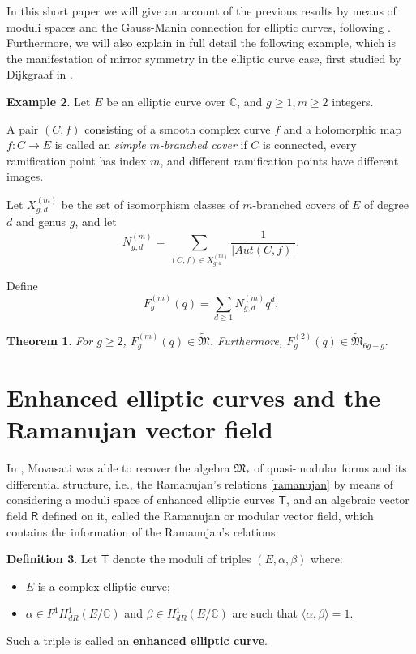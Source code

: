 \documentclass{article}
\numberwithin{equation}{section}
\numberwithin{figure}{section}
\theoremstyle{plain}
\newtheorem{theorem}{Theorem}[section]
\theoremstyle{definition}
\newtheorem{example}[theorem]{Example}
\newtheorem{definition}[theorem]{Definition}
\numberwithin{equation}{section}
\newtheorem[S, bodystyle=\normalfont\noindent]{defiS}{Definition}[section]
\begin{document}
In this short paper we will give an account of the previous results by means of moduli spaces and the Gauss-Manin connection for elliptic curves, following \parencite{mov2008,mov2012,pascal}. Furthermore, we will also explain in full detail the following example, which is the manifestation of mirror symmetry in the elliptic curve case, first studied by Dijkgraaf in \parencite{dijkgraaf}.
\begin{example}
Let $E$ be an elliptic curve over $\mathbb{C}$, and $g\geq 1, m\geq 2$ integers.

A pair $(C,f)$ consisting of a smooth complex curve $f$ and a holomorphic map $f:C\rightarrow E$ is called an \textit{simple $m$-branched cover} if $C$ is connected, every ramification point has index $m$, and different ramification points have different images.

Let $X_{g,d}^{(m)}$ be the set of isomorphism classes of $m$-branched covers of $E$ of degree $d$ and genus $g$, and let $$N_{g,d}^{(m)}=\sum_{(C,f)\in X_{g,d}^{(m)}} \frac{1}{|Aut{(C,f)}|}.$$

Define $$F_g^{(m)}(q)=\sum_{d\geq 1}N_{g,d}^{(m)}q^d.$$

\begin{theorem}\parencite{dijkgraaf,ochiai} For $g\geq 2$, $F_g^{(m)}(q)\in \mathfrak{\tilde{M}}$. Furthermore, $F_g^{(2)}(q)\in \mathfrak{\tilde{M}}_{6g-g}.$
\end{theorem}
\end{example}



\section{Enhanced elliptic curves and the Ramanujan vector field}


In \parencite{mov2008,mov2012,pascal}, Movasati was able to recover the algebra $\mathfrak{M}_{*}$ of quasi-modular forms and its differential structure, i.e., the Ramanujan's relations \ref{ramanujan} by means of considering a moduli space of enhanced elliptic curves $\mathsf{T}$, and an algebraic vector field $\mathsf{R}$ defined on it, called the Ramanujan or modular vector field, which contains the information of the Ramanujan's relations.


\begin{definition}\label{enhanced}
    Let $\mathsf{T}$ denote the moduli of triples $(E,\alpha,\beta)$ where:
    \begin{itemize}
    \item $E$ is a complex elliptic curve;
    \item $\alpha\in F^1H_{dR}^1(E/\mathbb{C})$ and $\beta\in H_{dR}^1(E/\mathbb{C})$ are such that $\langle \alpha,\beta\rangle=1$.
    \end{itemize}
    
    Such a triple is called an \textbf{enhanced elliptic curve}.
    \end{definition}
\end{document}
